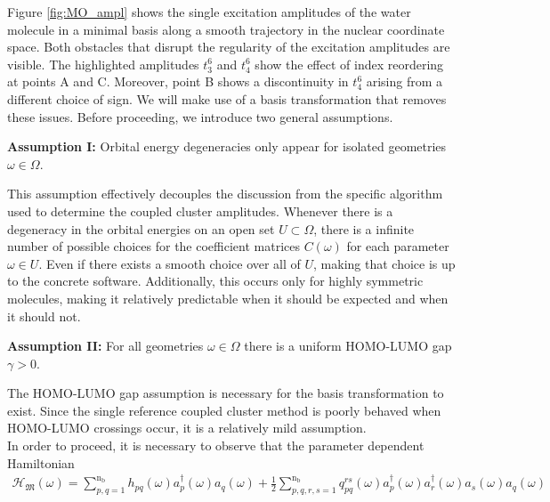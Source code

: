 \documentclass[reqno]{amsart}
\begin{document}
Figure \ref{fig:MO_ampl} shows the single excitation amplitudes of the water molecule in a minimal basis along a smooth trajectory in the nuclear coordinate space. Both obstacles that disrupt the regularity of the excitation amplitudes are visible. The highlighted amplitudes $t^6_3$ and $t^6_4$ show the effect of index reordering at points A and C. Moreover, point B shows a discontinuity in $t^6_4$ arising from a different choice of sign. We will make use of a basis transformation that removes these issues. Before proceeding, we introduce two general assumptions.

\begin{assumptionbox}{\textbf{Assumption I:}}\label{Assum_I}
Orbital energy degeneracies only appear for isolated geometries $\omega \in \Omega$.
\end{assumptionbox}
This assumption effectively decouples the discussion from the specific algorithm used to determine the coupled cluster amplitudes. Whenever there is a degeneracy in the orbital energies on an open set $U\subset \Omega$, there is a infinite number of possible choices for the coefficient matrices $C(\omega)$ for each parameter $\omega \in U$. Even if there exists a smooth choice over all of $U$, making that choice is up to the concrete software. Additionally, this occurs only for highly symmetric molecules, making it relatively predictable when it should be expected and when it should not.
\begin{assumptionbox}{\textbf{Assumption II:}}\label{Assum_II}
For all geometries $\omega\in \Omega$ there is a uniform HOMO-LUMO gap $\gamma>0$.
\end{assumptionbox}
The HOMO-LUMO gap assumption is necessary for the basis transformation to exist. Since the single reference coupled cluster method is poorly behaved when HOMO-LUMO crossings occur, it is a relatively mild assumption.\\
\newline
In order to proceed, it is necessary to observe that the parameter dependent Hamiltonian
\begin{align}
\mathcal{H}_\mathfrak{M}(\omega)=\sum_{p,q=1}^{\text{n}_\text{b}} h_{pq}(\omega)a^\dagger_p(\omega)a_q(\omega)+\frac{1}{2}\sum^{\text{n}_\text{b}}_{p,q,r,s=1}q^{rs}_{pq}(\omega)a^\dagger_p(\omega) a^\dagger_r(\omega)a_s(\omega)a_q(\omega)
\end{align}
\end{document}
